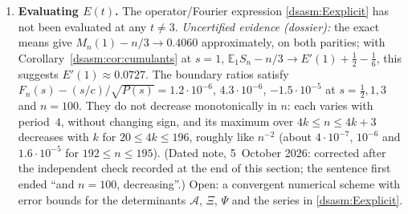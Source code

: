 \documentclass[11pt,letterpaper]{article}
\theoremstyle{remark}\newtheorem{remark}[theorem]{Remark}
\begin{document}
\begin{enumerate}
\item \textbf{Evaluating $E(t)$.} The operator/Fourier expression \eqref{dsasm:Eexplicit} has not been evaluated at any $t\ne3$. \emph{Uncertified evidence (dossier):} the exact means give $M_n(1)-n/3\to0.4060$ approximately, on both parities; with Corollary~\ref{dsasm:cor:cumulants} at $s=1$, $\mathbb E_1S_n-n/3\to E'(1)+\frac12-\frac16$, this suggests $E'(1)\approx0.0727$. The boundary ratios satisfy $F_n(s)-(s/c)/\sqrt{P(s)}=1.2\cdot10^{-6}$, $4.3\cdot10^{-6}$, $-1.5\cdot10^{-5}$ at $s=\frac12,1,3$ and $n=100$. They do not decrease monotonically in $n$: each varies with period~$4$, without changing sign, and its maximum over $4k\le n\le4k+3$ decreases with $k$ for $20\le4k\le196$, roughly like $n^{-2}$ (about $4\cdot10^{-7}$, $10^{-6}$ and $1.6\cdot10^{-5}$ for $192\le n\le195$). (Dated note, 5~October 2026: corrected after the independent check recorded at the end of this section; the sentence first ended ``and $n=100$, decreasing''.) Open: a convergent numerical scheme with error bounds for the determinants $\mathcal A$, $\Xi$, $\Psi$ and the series in \eqref{dsasm:Eexplicit}.
\end{enumerate}
\end{document}
